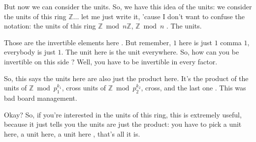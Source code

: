 \begin{speech}[00:17:15 - 00:18:35]
But now we can consider the units. So, we have this idea of the units: we consider the units of this ring $\mathbb{Z}$... let me just write it, 'cause I don't want to confuse the notation: the units of this ring $\mathbb{Z} \bmod n\mathbb{Z}$, $\mathbb{Z} \bmod n$ . The units.

Those are the invertible elements here . But remember, $1$ here  is just $1$ comma $1$, everybody is just $1$. The unit here is the unit everywhere. So, how can you be invertible on this side ? Well, you have to be invertible in every factor.

So, this says the units here are also just the product here. It's the product of the units of $\mathbb{Z} \bmod p_1^{k_1}$, cross units of $\mathbb{Z} \bmod p_2^{k_2}$, cross, and the last one . This was bad board management.

Okay? So, if you're interested in the units of this ring, this is extremely useful, because it just tells you the units are just the product: you have to pick a unit here, a unit here, a unit here , that's all it is.
\end{speech}

